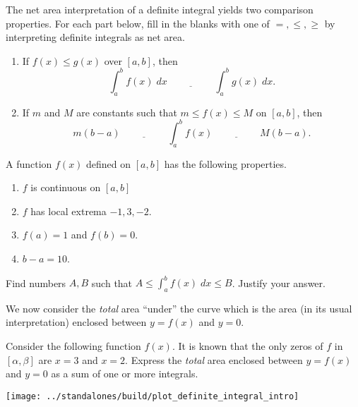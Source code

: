 \documentclass[../main.tex]{subfiles}
\begin{document}
  \clearpage

  The net area interpretation of a definite integral yields two comparison properties. For each part below, fill in the blanks with one of \(=, \le , \ge\) by interpreting definite integrals as net area.
  \begin{enumerate}
    \item If \(f(x) \le g(x)\) over \([a,b]\), then
      \[
        \int_{a}^{b} f(x) \;dx \underline{\hspace{2cm}} \int_{a}^{b} g(x) \;dx.
      \]

    \item If \(m\) and \(M\) are constants such that \(m \le f(x) \le M\) on \([a,b]\), then
      \[
        m(b-a) \underline{\hspace{2cm}} \int_{a}^{b} f(x) \underline{\hspace{2cm}} M(b-a).
      \]
  \end{enumerate}

  \begin{example}
    A function \(f(x)\) defined on \([a,b]\) has the following properties. 
    \begin{enumerate}
      \item \(f\) is continuous on \([a,b]\)
      \item \(f\) has local extrema \(-1, 3, -2\). 
      \item \(f(a) = 1\) and \(f(b) = 0\).
      \item \(b - a = 10\).
    \end{enumerate}

    Find numbers \(A,B\) such that \(A \le \int_{a}^{b} f(x) \;dx \le B\). Justify your answer. 
  \end{example}
  \clearpage
 
  We now consider the \emph{total} area ``under'' the curve which is the area (in its usual interpretation) enclosed between \(y = f(x)\) and \(y = 0\).


  \begin{example}
    Consider the following function \(f(x)\).  It is known that the only zeros of \(f\) in \([\alpha, \beta]\) are \(x = 3\) and \(x = 2\). Express the \emph{total} area enclosed between \(y = f(x)\) and \(y = 0\) as a sum of one or more integrals.

    \texttt{[image: ../standalones/build/plot\_definite\_integral\_intro]}

  \end{example}
  \clearpage
\end{document}

